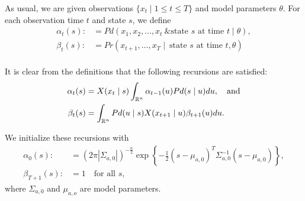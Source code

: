 \documentclass[12pt,leqno]{article}
\begin{document}
As usual, we are given observations $\{x_t\mid 1\le t\le T\}$ and model parameters $\theta$.  For each observation time $t$ and state $s$, we define
\begin{align*}
  \alpha_t(s) :&= Pd(x_1,x_2,\dots,x_t~ \& \text{state $s$ at time $t$}\mid \theta ),\\
  \beta_t(s) :&= Pr(x_{t+1},\dots,x_T \mid ~\text{state $s$ at time $t$},\theta)\\
\end{align*}

It is clear from the definitions that the following recursions are satisfied:
\begin{align}
\alpha_t(s) &= X(x_t \mid s)\int_{{\mathbb R}^n}\alpha_{t-1}(u)Pd(s \mid u)du,\quad\text{and}\label{alpha:0}\\
\beta_t(s) &= \int_{{\mathbb R}^{n}}Pd(u \mid s)X(x_{t+1} \mid u)\beta_{t+1}(u)du.\label{beta:0}
\end{align}

We initialize these recursions with
\begin{align*}
\alpha_0(s) :&= (2\pi|\Sigma_{a,0}|)^{-\frac{n}{2}}\exp\left\{-\frac{1}{2}(s-\mu_{a,0})^T\Sigma_{a,0}^{-1}(s-\mu_{a,0})\right\},\\
\beta_{T+1}(s) :&= 1 \quad\text{for all $s$},
\end{align*}
where $\Sigma_{a,0}$ and $\mu_{a,o}$ are model parameters.
\end{document}
